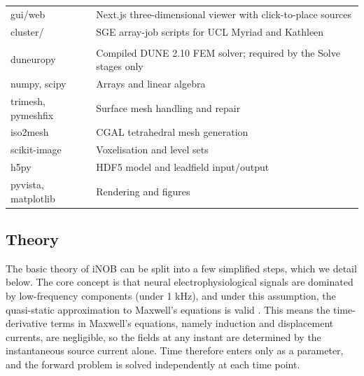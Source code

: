 \documentclass[11pt]{article}
\begin{document}
\begin{longtable}[]{@{}
  >{\raggedright\arraybackslash}p{}
  >{\raggedright\arraybackslash}p{}@{}}
gui/web & Next.js three-dimensional viewer with click-to-place
sources \\
cluster/ & SGE array-job scripts for UCL Myriad and Kathleen \\
\addlinespace[4pt]
\multicolumn{2}{@{}l}{\textit{External dependencies}} \\
\addlinespace[1pt]
duneuropy & Compiled DUNE 2.10 FEM solver; required by the Solve stages
only \\
numpy, scipy & Arrays and linear algebra \\
trimesh, pymeshfix & Surface mesh handling and repair \\
iso2mesh & CGAL tetrahedral mesh generation \\
scikit-image & Voxelisation and level sets \\
h5py & HDF5 model and leadfield input/output \\
pyvista, matplotlib & Rendering and figures \\
\end{longtable}
\vspace{8pt}

\subsection{Theory}\label{theory}

The basic theory of iNOB can be split into a few simplified steps, which
we detail below. The core concept is that neural electrophysiological
signals are dominated by low-frequency components (under 1 kHz), and
under this assumption, the quasi-static approximation to
Maxwell's equations \citep{247} is valid \citep{246}.
This means the time-derivative terms in Maxwell's
equations, namely induction and displacement currents, are negligible,
so the fields at any instant are determined by the instantaneous source
current alone. Time therefore enters only as a parameter, and the
forward problem is solved independently at each time point.
\end{document}
